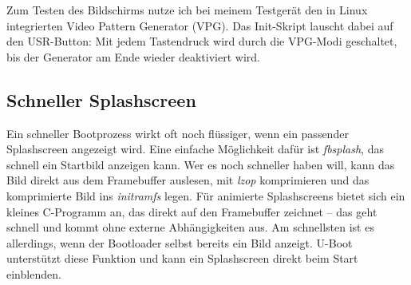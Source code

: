 Zum Testen des Bildschirms nutze ich bei meinem Testgerät den in Linux integrierten Video Pattern Generator
(VPG). Das Init-Skript lauscht dabei auf den USR-Button: Mit jedem Tastendruck wird durch die VPG-Modi
geschaltet, bis der Generator am Ende wieder deaktiviert wird.

\subsection{Schneller Splashscreen}
Ein schneller Bootprozess wirkt oft noch flüssiger, wenn ein passender Splashscreen angezeigt wird. Eine
einfache Möglichkeit dafür ist \textit{fbsplash}, das schnell ein Startbild anzeigen kann. Wer es noch
schneller haben will, kann das Bild direkt aus dem Framebuffer auslesen, mit \textit{lzop} komprimieren und
das komprimierte Bild ins \textit{initramfs} legen. Für animierte Splashscreens bietet sich ein kleines
C-Programm an, das direkt auf den Framebuffer zeichnet – das geht schnell und kommt ohne externe
Abhängigkeiten aus. Am schnellsten ist es allerdings, wenn der Bootloader selbst bereits ein Bild anzeigt.
U-Boot unterstützt diese Funktion und kann ein Splashscreen direkt beim Start einblenden.

